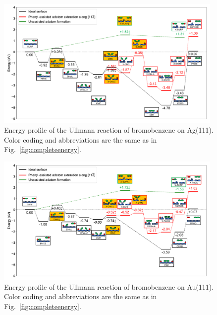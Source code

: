 \documentclass[aps,prb,amsmath,amssymb,11pt]{revtex4-1}
\begin{document}
\begin{figure}[bt]
\centering
\includegraphics[width=0.98\textwidth]{Fig/Ag_mainfile.pdf}
\caption{Energy profile of the Ullmann reaction of bromobenzene on Ag(111). Color coding and abbreviations are the same as in Fig.~\ref{fig:completeenergy}.}
\label{fig:Ag_all}
\end{figure}

\begin{figure}[bt]
\centering
\includegraphics[width=0.98\textwidth]{Fig/Au_mainfile.pdf}
\caption{Energy profile of the Ullmann reaction of bromobenzene on Au(111). Color coding and abbreviations are the same as in Fig.~\ref{fig:completeenergy}.}
\label{fig:Au_all}
\end{figure}
\end{document}
